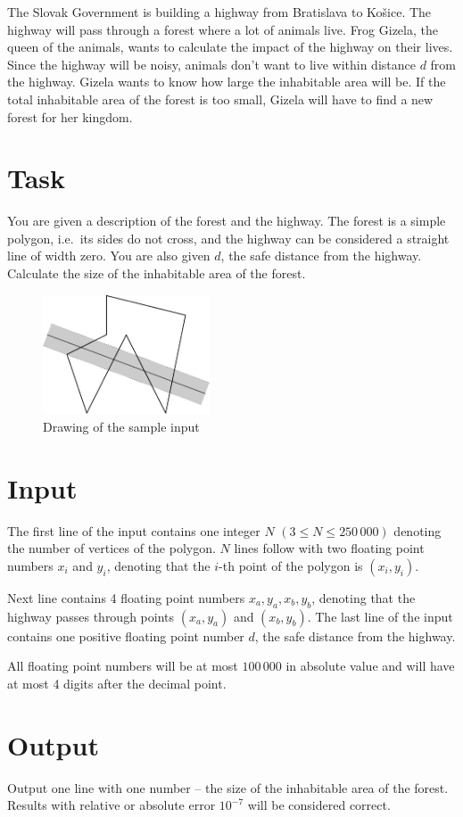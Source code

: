

The Slovak Government is building a highway from Bratislava to Košice. The highway will pass through
a forest where a lot of animals live. Frog Gizela, the queen of the animals, wants to calculate the
impact of the highway on their lives. Since the highway will be noisy, animals don't want to live
within distance $d$ from the highway. Gizela wants to know how large the inhabitable area will be.
If the total inhabitable area of the forest is too small, Gizela will have to find a new forest
for her kingdom.

\section*{Task}

You are given a description of the forest and the highway. The forest is a simple polygon, i.e.\ its
sides do not cross, and the highway can be considered a straight line of width zero. You are also
given $d$, the safe distance from the highway. Calculate the size of the inhabitable area of the forest.

\begin{figure}[h]
    \begin{center}
    \includegraphics[width=0.44\textwidth]{polygon}
    \caption{Drawing of the sample input}
    \end{center}
\end{figure}

\section*{Input}
The first line of the input contains one integer $N$ $(3\leq N\leq 250\,000)$ denoting the number
of vertices of the polygon. $N$ lines follow with two floating point numbers $x_i$ and
$y_i$, denoting that the $i$-th point of the polygon is $(x_i, y_i)$.

Next line contains 4 floating point numbers $x_a, y_a, x_b, y_b$, denoting that the highway passes
through points $(x_a, y_a)$ and $(x_b, y_b)$. The last line of the input contains one positive
floating point number $d$, the safe distance from the highway.

All floating point numbers will be at most $100\,000$ in absolute value and will have at most 4
digits after the decimal point.

\section*{Output}
Output one line with one number -- the size of the inhabitable area of the forest. Results with
relative or absolute error $10^{-7}$ will be considered correct.

